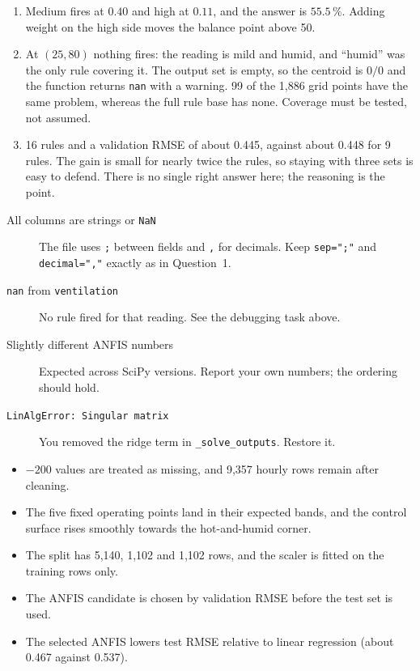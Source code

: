 \begin{expectedfindings}
\begin{enumerate}
  \item Medium fires at $0.40$ and high at $0.11$, and the answer is $55.5\,\%$. Adding weight on the high side moves the balance point above 50.
  \item At $(25,80)$ nothing fires: the reading is mild and humid, and ``humid'' was the only rule covering it. The output set is empty, so the centroid is $0/0$ and the function returns \texttt{nan} with a warning. 99 of the 1,886 grid points have the same problem, whereas the full rule base has none. Coverage must be tested, not assumed.
  \item 16 rules and a validation RMSE of about 0.445, against about 0.448 for 9 rules. The gain is small for nearly twice the rules, so staying with three sets is easy to defend. There is no single right answer here; the reasoning is the point.
\end{enumerate}
\end{expectedfindings}

\begin{troubleshoot}
\begin{description}
  \item[All columns are strings or \texttt{NaN}] The file uses \texttt{;} between fields and \texttt{,} for decimals. Keep \texttt{sep=";"} and \texttt{decimal=","} exactly as in Question~1.
  \item[\texttt{nan} from \texttt{ventilation}] No rule fired for that reading. See the debugging task above.
  \item[Slightly different ANFIS numbers] Expected across SciPy versions. Report your own numbers; the ordering should hold.
  \item[\texttt{LinAlgError: Singular matrix}] You removed the ridge term in \texttt{\_solve\_outputs}. Restore it.
\end{description}
\end{troubleshoot}

\begin{verification}
\begin{itemize}
  \item $-200$ values are treated as missing, and 9,357 hourly rows remain after cleaning.
  \item The five fixed operating points land in their expected bands, and the control surface rises smoothly towards the hot-and-humid corner.
  \item The split has 5,140, 1,102 and 1,102 rows, and the scaler is fitted on the training rows only.
  \item The ANFIS candidate is chosen by validation RMSE before the test set is used.
  \item The selected ANFIS lowers test RMSE relative to linear regression (about 0.467 against 0.537).
\end{itemize}
\end{verification}

